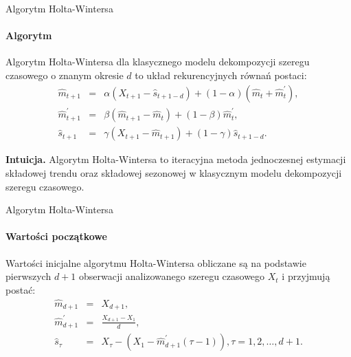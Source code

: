 \documentclass[a4paper, 11pt]{beamer}
\begin{document}
	\begin{frame}{Algorytm Holta-Wintersa}
		\framesubtitle{Algorytm}
		Algorytm Holta-Wintersa dla klasycznego modelu dekompozycji szeregu 
		czasowego o znanym okresie $d$ to układ rekurencyjnych równań 
		postaci: \begin{eqnarray*}
			\hat{m}_{t+1} & = &
				\alpha \left(X_{t+1} - \hat{s}_{t+1-d}\right) +
				\left(1 - \alpha\right) \left( \hat{m}_t + \hat{m}^{\prime}_t\right),\\
			\hat{m}^{\prime}_{t+1} & = &
				\beta \left(\hat{m}_{t+1} - \hat{m}_t\right) +
				\left(1 - \beta\right) \hat{m}^{\prime}_t,\\
			\hat{s}_{t+1} & = &
				\gamma \left(X_{t+1} - \hat{m}_{t+1}\right) +
				\left(1 - \gamma\right) \hat{s}_{t+1-d}.
		\end{eqnarray*}
		\begin{alert}{\textbf{Intuicja.}}
			Algorytm Holta-Wintersa to iteracyjna metoda jednoczesnej estymacji 
			składowej trendu oraz składowej sezonowej w klasycznym modelu 
			dekompozycji szeregu czasowego.
		\end{alert}
	\end{frame}
	
	\begin{frame}{Algorytm Holta-Wintersa}
		\framesubtitle{Wartości początkowe}
		Wartości inicjalne algorytmu Holta-Wintersa obliczane są na podstawie 
		pierwszych $d+1$ obserwacji analizowanego szeregu czasowego $X_t$ i 
		przyjmują postać: \begin{eqnarray*}
			\hat{m}_{d+1} & = & X_{d+1},\\
			\hat{m}^{\prime}_{d+1} & = & \frac{X_{d+1} - X_1}{d},\\
			\hat{s}_{\tau} & = & X_{\tau} -
				\left(X_1 - \hat{m}^{\prime}_{d+1}\left(\tau - 1\right)\right), 
				\tau = 1, 2, \ldots, d+1.
		\end{eqnarray*}
	\end{frame}
	
\end{document}
